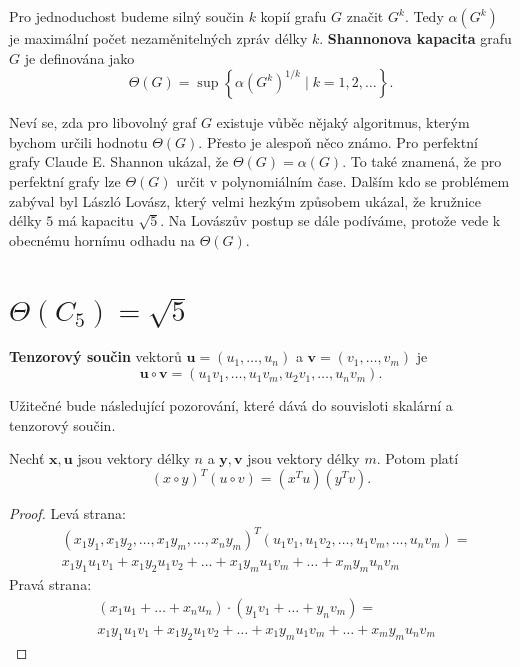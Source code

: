Pro jednoduchost budeme silný součin $k$ kopií grafu $G$ značit $G^k$. Tedy $\alpha(G^k)$ je maximální počet nezaměnitelných zpráv délky $k$. \textbf{Shannonova kapacita} grafu $G$ je definována jako
$$
    \Theta(G) = \sup \left\{ \alpha(G^k)^{1/k} \mid k = 1, 2, \dots \right\}.
$$

Neví se, zda pro libovolný graf $G$ existuje vůběc nějaký algoritmus, kterým bychom určili hodnotu $\Theta(G)$. Přesto je alespoň něco známo. Pro perfektní grafy Claude E. Shannon ukázal, že $\Theta(G) = \alpha(G)$. To také znamená, že pro perfektní grafy lze $\Theta(G)$ určit v polynomiálním čase. Dalším kdo se problémem zabýval byl László Lovász, který velmi hezkým způsobem ukázal, že kružnice délky $5$ má kapacitu $\sqrt{5}$. Na Lovászův postup se dále podíváme, protože vede k obecnému hornímu odhadu na $\Theta(G)$.

\section{$\Theta(C_5) = \sqrt{5}$}

\textbf{Tenzorový součin} vektorů $\mathbf{u} = \left(u_1, \dots, u_n \right)$ a $\mathbf{v} = \left(v_1, \dots, v_m \right)$ je
$$
    \mathbf{u} \circ \mathbf{v} = \left( u_1 v_1, \dots, u_1 v_m, u_2 v_1, \dots, u_n v_m \right).
$$

Užitečné bude následující pozorování, které dává do souvisloti skalární a tenzorový součin.

\begin{pz}
    Nechť $\mathbf{x}, \mathbf{u}$ jsou vektory délky $n$ a $\mathbf{y}, \mathbf{v}$ jsou vektory délky $m$. Potom platí
    \begin{equation}
        \left( x \circ y \right)^T \left( u \circ v \right) = \left( x^T u \right) \left( y^T v \right).
        \label{eq:tensor_scalar_product}
    \end{equation}
\end{pz}

\begin{proof}
    Levá strana:
    \begin{equation*}
        \begin{split}
        & \left(x_1 y_1, x_1 y_2, \dots, x_1 y_m, \dots, x_n y_m \right)^T \left( u_1 v_1, u_1 v_2, \dots, u_1 v_m, \dots, u_n v_m \right) = \\
        & x_1 y_1 u_1 v_1 + x_1 y_2 u_1 v_2 + \dots + x_1 y_m u_1 v_m + \dots + x_m y_m u_n v_m
        \end{split}
    \end{equation*}
    Pravá strana:
    \begin{equation*}
        \begin{split}
            & \left( x_1 u_1 + \dots + x_n u_n \right) \cdot \left( y_1 v_1 + \dots + y_n v_m \right) = \\
            & x_1 y_1 u_1 v_1 + x_1 y_2 u_1 v_2 + \dots + x_1 y_m u_1 v_m + \dots + x_m y_m u_n v_m
        \end{split}
    \end{equation*}
\end{proof}


